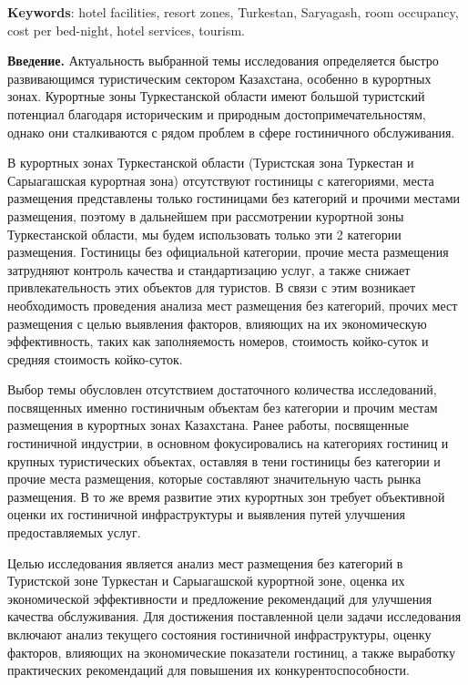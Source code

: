 {\bfseries Keywords}: hotel facilities, resort zones, Turkestan, Saryagash,
room occupancy, cost per bed-night, hotel services, tourism.
\vspace{-0.5em}
\begin{multicols}{2}
{\bfseries Введение.} Актуальность выбранной темы исследования определяется
быстро развивающимся туристическим сектором Казахстана, особенно в
курортных зонах. Курортные зоны Туркестанской области имеют большой
туристский потенциал благодаря историческим и природным
достопримечательностям, однако они сталкиваются с рядом проблем в сфере
гостиничного обслуживания.

В курортных зонах Туркестанской области (Туристская зона Туркестан и
Сарыагашская курортная зона) отсутствуют гостиницы с категориями, места
размещения представлены только гостиницами без категорий и прочими
местами размещения, поэтому в дальнейшем при рассмотрении курортной зоны
Туркестанской области, мы будем использовать только эти 2 категории
размещения. Гостиницы без официальной категории, прочие места размещения
затрудняют контроль качества и стандартизацию услуг, а также снижает
привлекательность этих объектов для туристов. В связи с этим возникает
необходимость проведения анализа мест размещения без категорий, прочих
мест размещения с целью выявления факторов, влияющих на их экономическую
эффективность, таких как заполняемость номеров, стоимость койко-суток и
средняя стоимость койко-суток.

Выбор темы обусловлен отсутствием достаточного количества исследований,
посвященных именно гостиничным объектам без категории и прочим местам
размещения в курортных зонах Казахстана. Ранее работы, посвященные
гостиничной индустрии, в основном фокусировались на категориях гостиниц
и крупных туристических объектах, оставляя в тени гостиницы без
категории и прочие места размещения, которые составляют значительную
часть рынка размещения. В то же время развитие этих курортных зон
требует объективной оценки их гостиничной инфраструктуры и выявления
путей улучшения предоставляемых услуг.

Целью исследования является анализ мест размещения без категорий в
Туристской зоне Туркестан и Сарыагашской курортной зоне, оценка их
экономической эффективности и предложение рекомендаций для улучшения
качества обслуживания. Для достижения поставленной цели задачи
исследования включают анализ текущего состояния гостиничной
инфраструктуры, оценку факторов, влияющих на экономические показатели
гостиниц, а также выработку практических рекомендаций для повышения их
конкурентоспособности.


\end{multicols}
